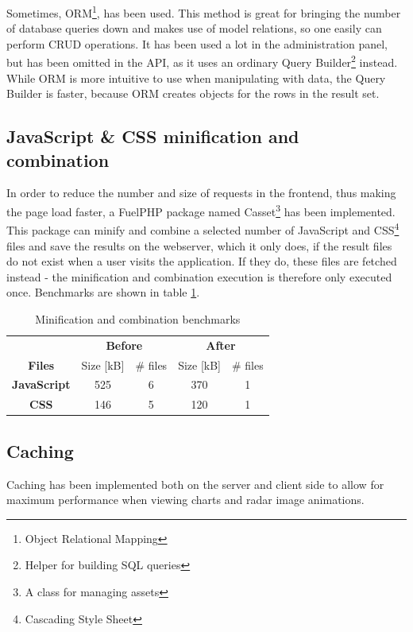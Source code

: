 Sometimes, \textsf{ORM}\footnote{Object Relational Mapping}, has been used. This method is great for bringing the number of database queries down and makes use of model relations, so one easily can perform CRUD operations. It has been used a lot in the administration panel, but has been omitted in the API, as it uses an ordinary \textsf{Query Builder}\footnote{Helper for building SQL queries} instead. While \textsf{ORM} is more intuitive to use when manipulating with data, the \textsf{Query Builder} is faster, because \textsf{ORM} creates objects for the rows in the result set. 

\subsection{JavaScript \& CSS minification and combination}
\label{sec:javascript_and_css_minification_and_combintaion}
In order to reduce the number and size of requests in the frontend, thus making the page load faster, a FuelPHP package named \textsf{Casset}\footnote{A class for managing assets} has been implemented. This package can minify and combine a selected number of JavaScript and CSS\footnote{Cascading Style Sheet} files and save the results on the webserver, which it only does, if the result files do not exist when a user visits the application. If they do, these files are fetched instead - the minification and combination execution is therefore only executed once. Benchmarks are shown in table \ref{tab:minify_css}.

\begin{table}[htbp]
\centering
\begin{tabular}{| c | c | c | c | c |}
\hline
\multicolumn{1}{|c|}{\multirow{1}{*}{}} & \multicolumn{2}{|c|}{\textbf{Before}} & \multicolumn{2}{|c|}{\textbf{After}} \\ \cline{2-5}
\textbf{Files} & 
Size [kB] & \# files & Size [kB] & \# files \\ \hline

\textbf{JavaScript} &
525 & 6 & 370 & 1     \\ \hline

\textbf{CSS} &
146 & 5 & 120 & 1\\ \hline
\end{tabular}
\caption{Minification and combination benchmarks}
\label{tab:minify_css}
\end{table}

\subsection{Caching}
\label{sec:caching}
Caching has been implemented both on the server and client side to allow for maximum performance when viewing charts and radar image animations.

